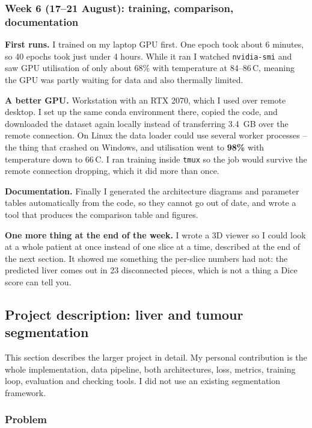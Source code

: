 \documentclass[11pt,a4paper]{article}
\begin{document}
\subsubsection*{Week 6 (17--21 August): training, comparison, documentation}

\textbf{First runs.} I trained on my laptop GPU first. One epoch took about 6
minutes, so 40 epochs took just under 4 hours. While it ran I watched
\texttt{nvidia-smi} and saw GPU utilisation of only about 68\% with temperature
at 84--86\,\textdegree C, meaning the GPU was partly waiting for data and also
thermally limited.

\textbf{A better GPU.} Workstation with an RTX 2070,
which I used over remote desktop. I set up the same conda environment there,
copied the code, and downloaded the dataset again locally instead of transferring
3.4~GB over the remote connection. On Linux the data loader could use several
worker processes -- the thing that crashed on Windows, and utilisation went to
\textbf{98\%} with temperature down to 66\,\textdegree C. I ran training inside
\texttt{tmux} so the job would survive the remote connection dropping, which it
did more than once.


\textbf{Documentation.} Finally I generated the architecture diagrams and
parameter tables automatically from the code, so they cannot go out of date, and
wrote a tool that produces the comparison table and figures.

\textbf{One more thing at the end of the week.} I wrote a 3D viewer so I could
look at a whole patient at once instead of one slice at a time, described at the
end of the next section. It showed me something the per-slice numbers had not:
the predicted liver comes out in 23 disconnected pieces, which is not a thing a
Dice score can tell you.

\subsection{Project description: liver and tumour segmentation}

This section describes the larger project in detail. My personal contribution is
the whole implementation, data pipeline, both architectures, loss, metrics,
training loop, evaluation and checking tools. I did not use an existing
segmentation framework.

\subsubsection*{Problem}
\end{document}
